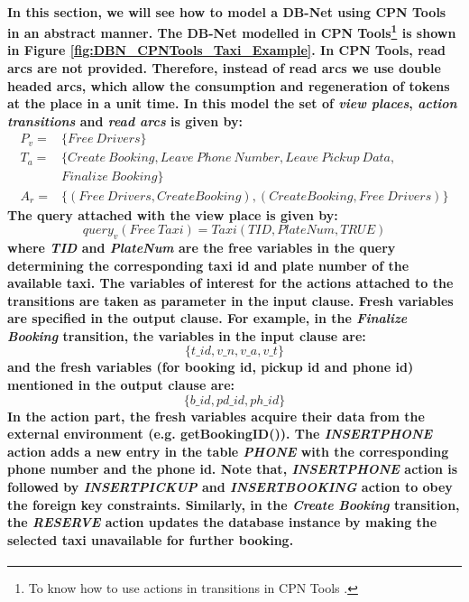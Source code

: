 \paragraph*{\textnormal{In this section, we will see how to model a DB-Net using CPN Tools in an abstract manner. The DB-Net modelled in CPN Tools\footnote{To know how to use actions in transitions in CPN Tools \cite{CPN_Tools_CodeSegment}.} is shown in Figure \ref{fig:DBN_CPNTools_Taxi_Example}. In CPN Tools, read arcs are not provided. Therefore, instead of read arcs we use double headed arcs, which allow the consumption and regeneration of tokens at the place in a unit time. In this model the set of \textit{view places}, \textit{action transitions} and \textit{read arcs} is given by:
\begin{equation*}
	\begin{aligned}
		P_{v} =& \{Free \ Drivers\}\\
		T_{a} =& \{Create\ Booking, Leave\ Phone\ Number, Leave\ Pickup\ Data,\\
		& Finalize\ Booking\}\\
		A_{r} =& \{(Free \ Drivers, Create Booking),(Create Booking, Free \ Drivers) \}
	\end{aligned}
\end{equation*}
The query attached with the view place is given by:
\begin{equation*}
	query_{v}(Free\ Taxi) = Taxi(TID,PlateNum,TRUE)
\end{equation*}
where \textit{TID} and \textit{PlateNum} are the free variables in the query determining the corresponding taxi id and plate number of the available taxi. The variables of interest for the actions attached to the transitions are taken as parameter in the input clause. Fresh variables are specified in the output clause. For example, in the \textit{Finalize Booking} transition, the variables in the input clause are:
\begin{equation*}
	\{t\_id, v\_n, v\_a, v\_t\}
\end{equation*}
and the fresh variables (for booking id, pickup id and phone id) mentioned in the output clause are:
\begin{equation*}
	\{b\_id,pd\_id,ph\_id\}
\end{equation*}
In the action part, the fresh variables acquire their data from the external environment (e.g. getBookingID()). The \textit{INSERTPHONE} action adds a new entry in the table \textit{PHONE} with the corresponding phone number and the phone id. Note that, \textit{INSERTPHONE} action is followed by \textit{INSERTPICKUP} and \textit{INSERTBOOKING} action to obey the foreign key constraints. Similarly, in the \textit{Create Booking} transition, the \textit{RESERVE} action updates the database instance by making the selected taxi unavailable for further booking.}}

